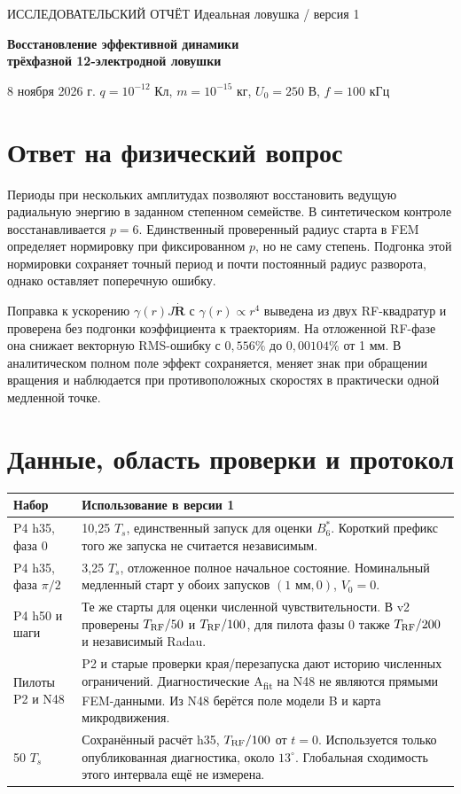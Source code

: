 \documentclass[11pt,a4paper]{article}
\newcommand{\V}{\dot{\mathbf R}}
\begin{document}
{\sffamily\small ИССЛЕДОВАТЕЛЬСКИЙ ОТЧЁТ \hfill Идеальная ловушка / версия 1}\par
\vspace{0.55cm}
{\sffamily\LARGE\bfseries Восстановление эффективной динамики\\[2pt]
трёхфазной 12-электродной ловушки\par}
\vspace{0.25cm}
{\small 8 ноября 2026 г. \quad $q=10^{-12}$ Кл, $m=10^{-15}$ кг, $U_0=250$ В, $f=100$ кГц}

\section*{Ответ на физический вопрос}
Периоды при нескольких амплитудах позволяют восстановить ведущую радиальную
энергию в заданном степенном семействе. В синтетическом контроле восстанавливается
$p=6$. Единственный проверенный радиус старта в FEM определяет нормировку при
фиксированном $p$, но не саму степень. Подгонка этой нормировки сохраняет точный
период и почти постоянный радиус разворота, однако оставляет поперечную ошибку.

Поправка к ускорению $\gamma(r)J\V$ с $\gamma(r)\propto r^4$ выведена из двух
RF-квадратур и проверена без подгонки коэффициента к траекториям.
На отложенной RF-фазе она снижает векторную RMS-ошибку с $0{,}556\%$ до
$0{,}00104\%$ от 1 мм. В аналитическом полном поле эффект сохраняется,
меняет знак при обращении вращения и наблюдается при противоположных
скоростях в практически одной медленной точке.

\section*{Данные, область проверки и протокол}
\begin{tabular}{@{}p{.28\linewidth}p{.67\linewidth}@{}}
\toprule
Набор & Использование в версии 1 \\
\midrule
P4 h35, фаза $0$ & 10,25 $T_s$, единственный запуск для оценки $B_6^\ast$.
Короткий префикс того же запуска не считается независимым. \\
P4 h35, фаза $\pi/2$ & 3,25 $T_s$, отложенное полное начальное состояние.
Номинальный медленный старт у обоих запусков $(1\text{ мм},0)$, $V_0=0$. \\
P4 h50 и шаги & Те же старты для оценки численной чувствительности.
В v2 проверены $T_{\rm RF}/50$ и $T_{\rm RF}/100$, для пилота фазы 0
также $T_{\rm RF}/200$ и независимый Radau. \\
Пилоты P2 и N48 & P2 и старые проверки края/перезапуска дают историю численных
ограничений. Диагностические A\textsubscript{fit} на N48 не являются прямыми FEM-данными.
Из N48 берётся поле модели B и карта микродвижения. \\
50 $T_s$ & Сохранённый расчёт h35, $T_{\rm RF}/100$ от $t=0$.
Используется только опубликованная диагностика, около $13^\circ$.
Глобальная сходимость этого интервала ещё не измерена. \\
\bottomrule
\end{tabular}
\end{document}
